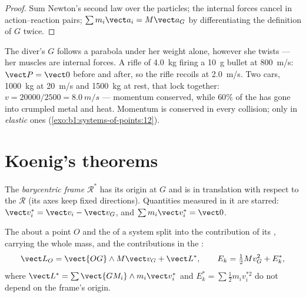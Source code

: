 \begin{proof}
Sum Newton's second law over the particles; the internal forces cancel
in action--reaction pairs; $\sum m_i\vect a_i = M\vect a_G$ by
differentiating the definition of $G$ twice.
\end{proof}

\begin{example}\label{ex:b1:systems-of-points:cm}
The diver's $G$ follows a parabola under her weight alone, however she
twists --- her muscles are internal forces. A rifle of \qty{4.0}{kg}
firing a \qty{10}{g} bullet at \qty{800}{m/s}: $\vect P = \vect 0$ before
and after, so the rifle recoils at \qty{2.0}{m/s}. Two cars, \qty{1000}{kg}
at \qty{20}{m/s} and \qty{1500}{kg} at rest, that lock together: $v =
20000/2500 = \qty{8.0}{m/s}$ --- momentum conserved, while $60\%$ of the
 has gone into crumpled metal and heat. Momentum is
conserved in every collision;  only in \emph{elastic} ones
(\cref{exo:b1:systems-of-points:12}).
\end{example}

\section{Koenig's theorems}

\begin{definition}\label{def:b1:systems-of-points:barycentric}
The \emph{barycentric frame} $\mathcal R^*$ has its origin at $G$ and is
in translation with respect to the  $\mathcal R$ (its axes
keep fixed directions). Quantities measured in it are starred: $\vect v_i^*
= \vect v_i - \vect v_G$, and $\sum m_i\vect v_i^* = \vect 0$.
\end{definition}

\begin{theorem}\label{thm:b1:systems-of-points:koenig}
The  about a point $O$ and the  of a
system split into the contribution of its , carrying the
whole mass, and the contributions in the :
\[
\vect L_O = \vect{OG}\wedge M\vect v_G + \vect L^*, \qquad
E_k = \tfrac12 Mv_G^2 + E_k^*,
\]
where $\vect L^* = \sum\vect{GM_i}\wedge m_i\vect v_i^*$ and $E_k^* = \sum\tfrac12
m_iv_i^{*2}$ do not depend on the frame's origin.
\end{theorem}

